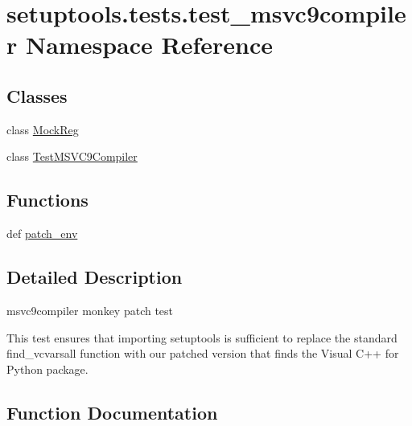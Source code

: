 \hypertarget{namespacesetuptools_1_1tests_1_1test__msvc9compiler}{}\section{setuptools.\+tests.\+test\+\_\+msvc9compiler Namespace Reference}
\label{namespacesetuptools_1_1tests_1_1test__msvc9compiler}
\subsection*{Classes}
\begin{DoxyCompactItemize}
\item 
class \hyperlink{classsetuptools_1_1tests_1_1test__msvc9compiler_1_1MockReg}{Mock\+Reg}
\item 
class \hyperlink{classsetuptools_1_1tests_1_1test__msvc9compiler_1_1TestMSVC9Compiler}{Test\+M\+S\+V\+C9\+Compiler}
\end{DoxyCompactItemize}
\subsection*{Functions}
\begin{DoxyCompactItemize}
\item 
def \hyperlink{namespacesetuptools_1_1tests_1_1test__msvc9compiler_a8982741c339b2c1a57b1efb582f952ff}{patch\+\_\+env}
\end{DoxyCompactItemize}


\subsection{Detailed Description}
\begin{DoxyVerb}msvc9compiler monkey patch test

This test ensures that importing setuptools is sufficient to replace
the standard find_vcvarsall function with our patched version that
finds the Visual C++ for Python package.
\end{DoxyVerb}
 

\subsection{Function Documentation}
\hypertarget{namespacesetuptools_1_1tests_1_1test__msvc9compiler_a8982741c339b2c1a57b1efb582f952ff}{}
